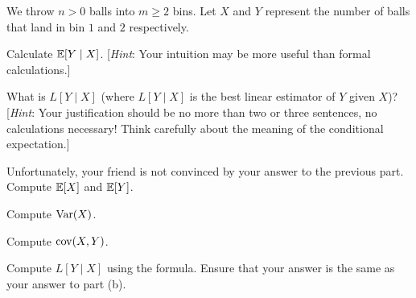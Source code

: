 \documentclass[11pt]{article}
\begin{document}
We throw $n > 0$ balls into $m \geq 2$ bins. Let $X$ and $Y$ represent the number 
of balls that land in bin $1$ and $2$ respectively.

\begin{Parts}

    \Part Calculate $\operatorname{\mathbb{E}}[Y \mid X]$. [\textit{Hint}: Your intuition may be more 
	useful than formal calculations.]

    \Part What is $L[Y \mid X]$ (where $L[Y \mid X]$ is the best linear estimator 
	of $Y$ given $X$)? [\textit{Hint}: Your justification should be no more than 
	two or three sentences, no calculations necessary! Think carefully about the 
	meaning of the conditional expectation.]

  \Part Unfortunately, your friend is not convinced by your answer to the 
  previous part. Compute $\operatorname{\mathbb{E}}[X]$ and $\operatorname{\mathbb{E}}[Y]$.

  \Part Compute $\operatorname{Var}(X)$.

  \Part Compute $\operatorname{cov}(X, Y)$.

  \Part Compute $L[Y \mid X]$ using the formula. Ensure that your answer is the 
  same as your answer to part (b).

\end{Parts}
\end{document}
